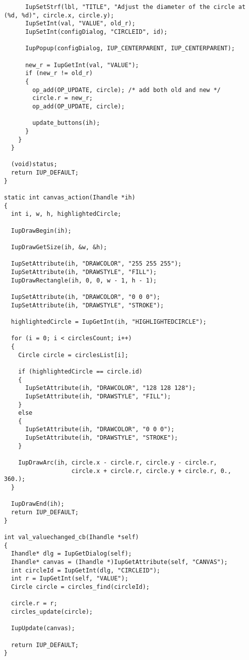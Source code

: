 \documentclass{ctexart}
\begin{document}
\begin{lstlisting}
      IupSetStrf(lbl, "TITLE", "Adjust the diameter of the circle at (%d, %d)", circle.x, circle.y);
      IupSetInt(val, "VALUE", old_r);
      IupSetInt(configDialog, "CIRCLEID", id);

      IupPopup(configDialog, IUP_CENTERPARENT, IUP_CENTERPARENT);

      new_r = IupGetInt(val, "VALUE");
      if (new_r != old_r)
      {
        op_add(OP_UPDATE, circle); /* add both old and new */
        circle.r = new_r;
        op_add(OP_UPDATE, circle);

        update_buttons(ih);
      }
    }
  }

  (void)status;
  return IUP_DEFAULT;
}

static int canvas_action(Ihandle *ih)
{
  int i, w, h, highlightedCircle;

  IupDrawBegin(ih);

  IupDrawGetSize(ih, &w, &h);

  IupSetAttribute(ih, "DRAWCOLOR", "255 255 255");
  IupSetAttribute(ih, "DRAWSTYLE", "FILL");
  IupDrawRectangle(ih, 0, 0, w - 1, h - 1);

  IupSetAttribute(ih, "DRAWCOLOR", "0 0 0");
  IupSetAttribute(ih, "DRAWSTYLE", "STROKE");

  highlightedCircle = IupGetInt(ih, "HIGHLIGHTEDCIRCLE");

  for (i = 0; i < circlesCount; i++)
  {
    Circle circle = circlesList[i];

    if (highlightedCircle == circle.id)
    {
      IupSetAttribute(ih, "DRAWCOLOR", "128 128 128");
      IupSetAttribute(ih, "DRAWSTYLE", "FILL");
    }
    else
    {
      IupSetAttribute(ih, "DRAWCOLOR", "0 0 0");
      IupSetAttribute(ih, "DRAWSTYLE", "STROKE");
    }

    IupDrawArc(ih, circle.x - circle.r, circle.y - circle.r,
                   circle.x + circle.r, circle.y + circle.r, 0., 360.);
  }

  IupDrawEnd(ih);
  return IUP_DEFAULT;
}

int val_valuechanged_cb(Ihandle *self)
{
  Ihandle* dlg = IupGetDialog(self);
  Ihandle* canvas = (Ihandle *)IupGetAttribute(self, "CANVAS");
  int circleId = IupGetInt(dlg, "CIRCLEID");
  int r = IupGetInt(self, "VALUE");
  Circle circle = circles_find(circleId);

  circle.r = r;
  circles_update(circle);

  IupUpdate(canvas);

  return IUP_DEFAULT;
}


\end{lstlisting}
\end{document}
